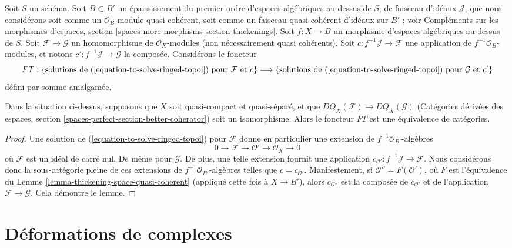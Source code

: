 \noindent
Soit $S$ un schéma. Soit $B \subset B'$ un épaississement du premier ordre
d'espaces algébriques au-dessus de $S$, de faisceau d'idéaux $\mathcal{J}$,
que nous considérons soit comme un $\mathcal{O}_B$-module quasi-cohérent, soit
comme un faisceau quasi-cohérent d'idéaux sur $B'$ ; voir Compléments sur les
morphismes d'espaces, section
\ref{spaces-more-morphisms-section-thickenings}.
Soit $f : X \to B$ un morphisme d'espaces algébriques au-dessus de $S$.
Soit $\mathcal{F} \to \mathcal{G}$ un homomorphisme de
$\mathcal{O}_X$-modules (non nécessairement quasi cohérents).
Soit $c : f^{-1}\mathcal{J} \to \mathcal{F}$ une application de
$f^{-1}\mathcal{O}_B$-modules, et notons
$c' : f^{-1}\mathcal{J} \to \mathcal{G}$ la composée.
Considérons le foncteur
$$
FT :
\{\text{solutions de }(\ref{equation-to-solve-ringed-topoi})
\text{ pour }\mathcal{F}\text{ et }c\}
\longrightarrow
\{\text{solutions de }(\ref{equation-to-solve-ringed-topoi})
\text{ pour }\mathcal{G}\text{ et }c'\}
$$
défini par somme amalgamée.

\begin{lemma}
\label{lemma-thickening-over-thickening-space-quasi-coherent}
Dans la situation ci-dessus, supposons que $X$ soit quasi-compact et
quasi-séparé, et que $DQ_X(\mathcal{F}) \to DQ_X(\mathcal{G})$
(Catégories dérivées des espaces, section
\ref{spaces-perfect-section-better-coherator}) soit un isomorphisme.
Alors le foncteur $FT$ est une équivalence de catégories.
\end{lemma}

\begin{proof}
Une solution de (\ref{equation-to-solve-ringed-topoi}) pour $\mathcal{F}$ donne
en particulier une extension de $f^{-1}\mathcal{O}_{B'}$-algèbres
$$
0 \to \mathcal{F} \to \mathcal{O}' \to \mathcal{O}_X \to 0
$$
où $\mathcal{F}$ est un idéal de carré nul. De même pour $\mathcal{G}$.
De plus, une telle extension fournit une application
$c_{\mathcal{O}'} : f^{-1}\mathcal{J} \to \mathcal{F}$.
Nous considérons donc la sous-catégorie pleine de ces extensions de
$f^{-1}\mathcal{O}_{B'}$-algèbres telles que $c = c_{\mathcal{O}'}$.
Manifestement, si $\mathcal{O}'' = F(\mathcal{O}')$, où $F$ est l'équivalence
du Lemme \ref{lemma-thickening-space-quasi-coherent} (appliqué cette fois à
$X \to B'$), alors $c_{\mathcal{O}''}$ est la composée de
$c_{\mathcal{O}'}$ et de l'application $\mathcal{F} \to \mathcal{G}$.
Cela démontre le lemme.
\end{proof}

\section{Déformations de complexes}
\label{section-deformations-complexes}

